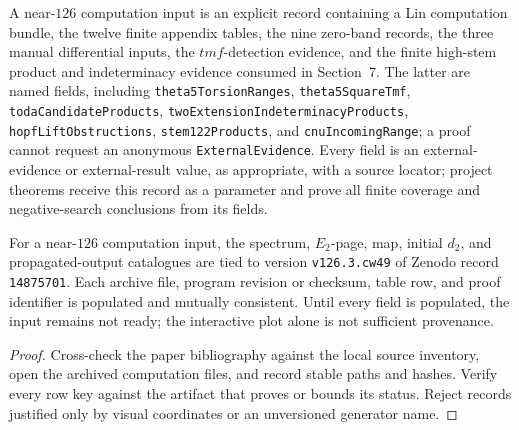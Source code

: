 \begin{definition}
  \label{def:near126-computation-input}
  \notready
  A near-$126$ computation input is an explicit record containing a Lin
  computation bundle, the twelve finite appendix tables, the nine zero-band
  records, the three manual differential inputs, the $tmf$-detection evidence,
  and the finite high-stem product and indeterminacy evidence consumed in
  Section~7.  The latter are named fields, including
  \texttt{theta5TorsionRanges}, \texttt{theta5SquareTmf},
  \texttt{todaCandidateProducts},
  \texttt{twoExtensionIndeterminacyProducts},
  \texttt{hopfLiftObstructions}, \texttt{stem122Products}, and
  \texttt{cnuIncomingRange}; a proof cannot request an anonymous
  \texttt{ExternalEvidence}.  Every field is an external-evidence or
  external-result value, as
  appropriate, with a source locator; project theorems receive this record as a
  parameter and prove all finite coverage and negative-search conclusions from
  its fields.
\end{definition}

\begin{proposition}
  \label{prop:lin-computation-provenance}
  \notready
  For a near-$126$ computation input, the spectrum, $E_2$-page, map, initial
  $d_2$, and propagated-output catalogues are tied to version
  \texttt{v126.3.cw49} of Zenodo record \texttt{14875701}.  Each archive file,
  program revision or checksum, table row, and proof identifier is populated
  and mutually consistent.  Until every field is populated, the input remains
  not ready; the interactive plot alone is not sufficient provenance.
\end{proposition}

\begin{proof}
  Cross-check the paper bibliography against the local source inventory, open
  the archived computation files, and record stable paths and hashes.  Verify
  every row key against the artifact that proves or bounds its status.  Reject
  records justified only by visual coordinates or an unversioned generator
  name.
\end{proof}

